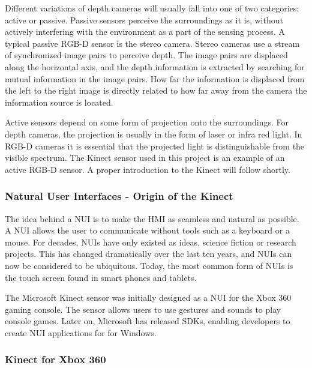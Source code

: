 Different variations of depth cameras will usually fall into one of two categories: active or passive. Passive sensors perceive the surroundings as it is, without actively interfering with the environment as a part of the sensing process. A typical passive RGB-D sensor is the stereo camera. Stereo cameras use a stream of synchronized image pairs to perceive depth. The image pairs are displaced along the horizontal axis, and the depth information is extracted by searching for mutual information in the image pairs. How far the information is displaced from the left to the right image is directly related to how far away from the camera the information source is located. 

Active sensors depend on some form of projection onto the surroundings. For depth cameras, the projection is usually in the form of laser or infra red light. In RGB-D cameras it is essential that the projected light is distinguishable from the visible spectrum. The Kinect sensor used in this project is an example of an active RGB-D sensor. A proper introduction to the Kinect will follow shortly.

\subsubsection{Natural User Interfaces - Origin of the Kinect}

The idea behind a \ac{NUI} is to make the \ac{HMI} as seamless and natural as possible. A \ac{NUI} allows the user to communicate without tools such as a keyboard or a mouse. For decades, \ac{NUI}s have only existed as ideas, science fiction or research projects. This has changed dramatically over the last ten years, and \ac{NUI}s can now be considered to be ubiquitous. Today, the most common form of \ac{NUI}s is the touch screen found in smart phones and tablets. 

The Microsoft Kinect sensor was initially designed as a \ac{NUI} for the Xbox 360 gaming console. The sensor allows users to use gestures and sounds to play console games. Later on, Microsoft has released SDKs, enabling developers to create \ac{NUI} applications for for Windows. 

\subsubsection{Kinect for Xbox 360}

